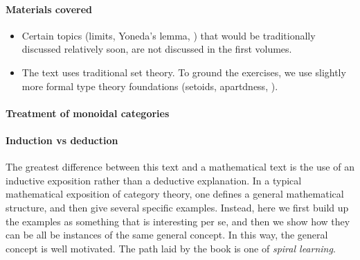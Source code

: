 \paragraph{Materials covered}
\begin{itemize}
    \item Certain topics (limits, Yoneda's lemma, \etc) that would be traditionally discussed relatively soon, are not discussed in the first volumes.

    \item The text uses traditional set theory.
          To ground the exercises, we use slightly more formal type theory foundations (setoids, apartdness, \etc).

\end{itemize}

\paragraph{Treatment of monoidal categories}


\paragraph{Induction vs deduction}

The greatest difference between this text and a mathematical text is the use of an inductive exposition rather than a deductive explanation.
In a typical mathematical exposition of category theory, one defines a general mathematical structure, and then give several specific examples.
Instead, here we first build up the examples as something that is interesting per se, and then we show how they can be all be instances of the same general concept.
In this way, the general concept is well motivated.
The path laid by the book is one of \emph{spiral learning}.


